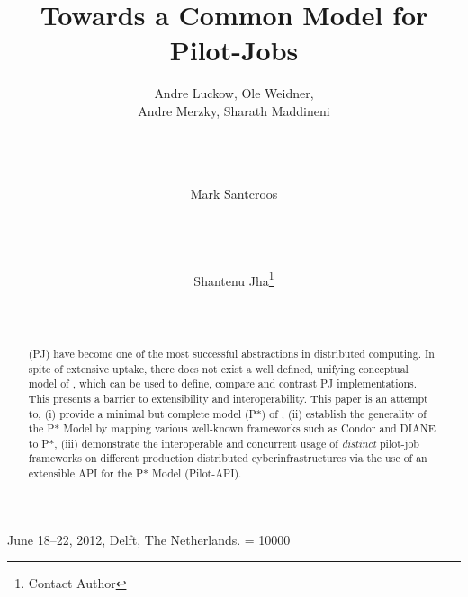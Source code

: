 \documentclass{sig-alt-release2}
\begin{document}
 {June 18--22, 2012, Delft, The Netherlands.} 
\widowpenalty = 10000





\title{Towards a Common Model for Pilot-Jobs\up}

\author{
\alignauthor Andre Luckow, Ole Weidner, \\Andre Merzky, Sharath Maddineni\\
       \\
       \\
        \\
\and
\alignauthor Mark Santcroos\\
       \\
       \\
       \\
\and
\alignauthor Shantenu Jha\footnote{Contact Author}\\
      \\
     \\
}

\date{}

\maketitle

\let\thefootnote\relax{}

\vspace{-2cm}
\begin{abstract} 
  \pilotjobs (PJ) have become one of the most successful abstractions in
  distributed computing. In spite of extensive uptake, there does not
  exist a well defined, unifying conceptual model of \pilotjobs, which
  can be used to define, compare and contrast PJ
  implementations. This presents a barrier to extensibility and
  interoperability. This paper is an attempt to, (i) provide a minimal
  but complete model (P*) of \pilotjobs, (ii) establish the generality
  of the P* Model by mapping various well-known \pilotjob
  frameworks such as Condor and DIANE to P*, (iii) demonstrate the
  interoperable and concurrent usage of {\it distinct} pilot-job
  frameworks on different production distributed cyberinfrastructures
  via the use of an extensible API for the P* Model (Pilot-API).
\end{abstract}
\end{document}
